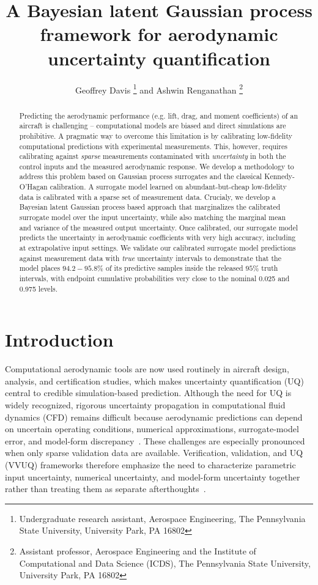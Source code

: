 \documentclass[a4paper,12pt]{article}
\title{A Bayesian latent Gaussian process framework for aerodynamic uncertainty quantification}
\author{Geoffrey Davis \footnote{Undergraduate research assistant, Aerospace Engineering, The Pennsylvania State University, University Park, PA 16802} and Ashwin Renganathan \footnote{Assistant professor, Aerospace Engineering and the Institute of Computational and Data Science (ICDS), The Pennsylvania State University, University Park, PA 16802}}
\affil{The Pennsylvania State University, University Park, PA 16802}
\date{}
\begin{document}
\maketitle


\begin{abstract}
Predicting the aerodynamic performance (e.g. lift, drag, and moment coefficients) of an aircraft is challenging -- computational models are biased and direct simulations are prohibitive. A pragmatic way to overcome this limitation is by calibrating low-fidelity computational predictions with experimental measurements. This, however, requires calibrating against \emph{sparse} measurements contaminated with \emph{uncertainty} in both the control inputs and the measured aerodynamic response. We develop a methodology to address this problem based on Gaussian process surrogates and the classical Kennedy-O'Hagan calibration. A surrogate model learned on abundant-but-cheap low-fidelity data is calibrated with a sparse set of measurement data. Crucialy, we develop a Bayesian latent Gaussian process based approach that marginalizes the calibrated surrogate model over the input uncertainty, while also matching the marginal mean and variance of the measured output uncertainty. Once calibrated, our surrogate model predicts the uncertainty in aerodynamic coefficients with very high accuracy, including at extrapolative input settings. We validate our calibrated surrogate model predictions against measurement data with \emph{true} uncertainty intervals to demonstrate that the model places $94.2-95.8\%$ of its predictive samples inside the released $95\%$ truth intervals, with endpoint cumulative probabilities very close to the nominal 0.025 and 0.975 levels.
\end{abstract}


\section{Introduction}

Computational aerodynamic tools are now used routinely in aircraft design, analysis, and certification studies, which makes uncertainty quantification (UQ) central to credible simulation-based prediction. Although the need for UQ is widely recognized, rigorous uncertainty propagation in computational fluid dynamics (CFD) remains difficult because aerodynamic predictions can depend on uncertain operating conditions, numerical approximations, surrogate-model error, and model-form discrepancy~\cite{Oberkampf2004}. These challenges are especially pronounced when only sparse validation data are available. Verification, validation, and UQ (VVUQ) frameworks therefore emphasize the need to characterize parametric input uncertainty, numerical uncertainty, and model-form uncertainty together rather than treating them as separate afterthoughts~\cite{Oberkampf2004}.
\end{document}
